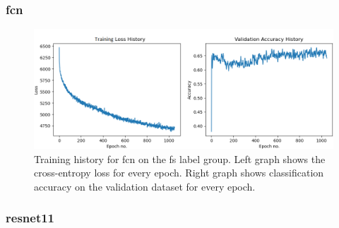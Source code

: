 
\subsubsection{\acrlong{fcn}}

\begin{figure}[h]
    \centering
    \includegraphics[width=\textwidth]{figures/res_tr_FCN_fstate.png}
    \caption{Training history for \acrlong{fcn} on the \acrshort{fs} label group. Left graph shows the cross-entropy loss for every epoch. Right graph shows classification accuracy on the validation dataset for every epoch.}
    \label{fig:res_tr_fcn}
\end{figure}
\FloatBarrier



\subsubsection{\acrlong{resnet11}}

